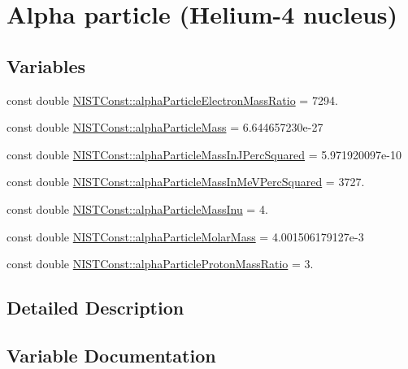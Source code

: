 \hypertarget{group___alpha}{}\section{Alpha particle (Helium-\/4 nucleus)}
\label{group___alpha}
\subsection*{Variables}
\begin{DoxyCompactItemize}
\item 
const double \hyperlink{group___alpha_ga9f00b32c60f1bc5b8a950b58e64d08c8}{N\+I\+S\+T\+Const\+::alpha\+Particle\+Electron\+Mass\+Ratio} = 7294.
\item 
const double \hyperlink{group___alpha_ga5a2a4f4310d2e3584253471fe4381b93}{N\+I\+S\+T\+Const\+::alpha\+Particle\+Mass} = 6.\+644657230e-\/27
\item 
const double \hyperlink{group___alpha_ga90b635a865e315d2c4cd14c26560c7dd}{N\+I\+S\+T\+Const\+::alpha\+Particle\+Mass\+In\+J\+Perc\+Squared} = 5.\+971920097e-\/10
\item 
const double \hyperlink{group___alpha_ga34f456e4d23d54ea0231ada958882a38}{N\+I\+S\+T\+Const\+::alpha\+Particle\+Mass\+In\+Me\+V\+Perc\+Squared} = 3727.
\item 
const double \hyperlink{group___alpha_ga1233ffb0d6537e112ce39623e6c6d0d5}{N\+I\+S\+T\+Const\+::alpha\+Particle\+Mass\+Inu} = 4.
\item 
const double \hyperlink{group___alpha_ga06d92f78de04d4e1d79b8468b04959ef}{N\+I\+S\+T\+Const\+::alpha\+Particle\+Molar\+Mass} = 4.\+001506179127e-\/3
\item 
const double \hyperlink{group___alpha_ga4629465057dc35ad7eecca610bcbd092}{N\+I\+S\+T\+Const\+::alpha\+Particle\+Proton\+Mass\+Ratio} = 3.
\end{DoxyCompactItemize}


\subsection{Detailed Description}


\subsection{Variable Documentation}
\mbox{\label{group___alpha_ga9f00b32c60f1bc5b8a950b58e64d08c8}} 
